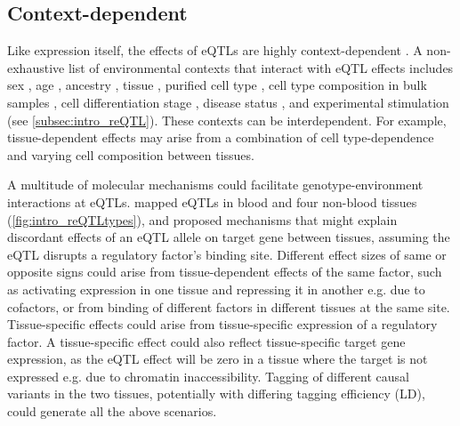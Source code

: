 \begin{outline}
\subsection{Context-dependent }

Like expression itself, the effects of \glspl{eQTL} are highly context-dependent \autocite{albert2015RoleRegulatoryVariation,vandiedonck2017GeneticAssociationMolecular}.
A non-exhaustive list of environmental contexts that interact with \gls{eQTL} effects includes
    sex \autocite{yao2014SexAgeinteractingEQTLs},
    age \autocite{yao2014SexAgeinteractingEQTLs},
    ancestry \autocite{dejager2015ImmVarProjectInsights,nedelec2016GeneticAncestryNatural,quach2017LivingAdaptiveWorld},
    tissue \autocite{nica2011ArchitectureGeneRegulatory,aguet2017GeneticEffectsGene},
    purified cell type \autocite{dimas2009CommonRegulatoryVariation,dejager2015ImmVarProjectInsights,peters2016InsightGenotypePhenotypeAssociations,chen2016GeneticDriversEpigenetic,calderon2019LandscapeStimulationresponsiveChromatin},
    cell type composition in bulk samples \autocite{westra2015CellSpecificEQTL,zhernakova2017IdentificationContextdependentExpression,glastonbury2019CellTypeHeterogeneityAdipose,kim-hellmuth2020CellTypeSpecific},
    cell differentiation stage \autocite{strober2019DynamicGeneticRegulation},
    disease status \autocite{peters2016InsightGenotypePhenotypeAssociations},
    and experimental stimulation (see \cref{subsec:intro_reQTL}).
These contexts can be interdependent.
For example, tissue-dependent effects may arise from a combination of cell type-dependence and varying cell composition between tissues.

A multitude of molecular mechanisms could facilitate genotype-environment interactions at \glspl{eQTL}.
\textcite{fu2012UnravelingRegulatoryMechanisms} mapped \glspl{eQTL} in blood and four non-blood tissues (\cref{fig:intro_reQTLtypes}), 
and proposed mechanisms that might explain discordant effects of an \gls{eQTL} allele on target gene between tissues,
assuming the \gls{eQTL} disrupts a regulatory factor's binding site.
Different effect sizes of same or opposite signs could arise 
from tissue-dependent effects of the same factor, such as activating expression in one tissue and repressing it in another e.g. due to cofactors,
or from binding of different factors in different tissues at the same site.
Tissue-specific effects could arise from tissue-specific expression of a regulatory factor.
A tissue-specific effect could also reflect tissue-specific target gene expression,
as the \gls{eQTL} effect will be zero in a tissue where the target is not expressed e.g. due to chromatin inaccessibility.
Tagging of different causal variants in the two tissues, potentially with differing tagging efficiency (\gls{LD}), could generate all the above scenarios.


\end{outline}
